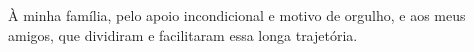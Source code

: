 À minha família, pelo apoio incondicional e motivo de orgulho, e aos meus amigos, que dividiram e facilitaram essa longa trajetória.